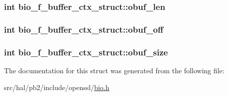 \subsubsection[{\texorpdfstring{obuf\+\_\+len}{obuf_len}}]{\setlength{\rightskip}{0pt plus 5cm}int bio\+\_\+f\+\_\+buffer\+\_\+ctx\+\_\+struct\+::obuf\+\_\+len}\hypertarget{structbio__f__buffer__ctx__struct_aa405c5c91239978aeabda2f9537db899}{}\label{structbio__f__buffer__ctx__struct_aa405c5c91239978aeabda2f9537db899}
\subsubsection[{\texorpdfstring{obuf\+\_\+off}{obuf_off}}]{\setlength{\rightskip}{0pt plus 5cm}int bio\+\_\+f\+\_\+buffer\+\_\+ctx\+\_\+struct\+::obuf\+\_\+off}\hypertarget{structbio__f__buffer__ctx__struct_a33d8e302dcb91873af9ed993094e1960}{}\label{structbio__f__buffer__ctx__struct_a33d8e302dcb91873af9ed993094e1960}
\subsubsection[{\texorpdfstring{obuf\+\_\+size}{obuf_size}}]{\setlength{\rightskip}{0pt plus 5cm}int bio\+\_\+f\+\_\+buffer\+\_\+ctx\+\_\+struct\+::obuf\+\_\+size}\hypertarget{structbio__f__buffer__ctx__struct_ac054193e554cf659d638b00484ba3b07}{}\label{structbio__f__buffer__ctx__struct_ac054193e554cf659d638b00484ba3b07}


The documentation for this struct was generated from the following file\+:\begin{DoxyCompactItemize}
\item 
src/hal/pb2/include/openssl/\hyperlink{bio_8h}{bio.\+h}\end{DoxyCompactItemize}
